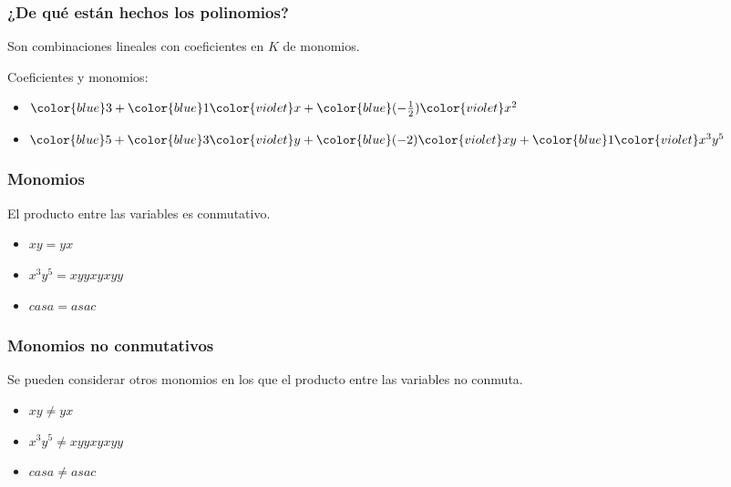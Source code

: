 \documentclass[spanish, aspectratio=169, hidecontrols]{beamer}
\begin{document}
\begin{frame}
  \frametitle{¿De qué están hechos los polinomios?}
  \pause
  Son combinaciones lineales con coeficientes en $K$ de monomios.
  \begin{exampleblock}{}
    {\color{blue}Coeficientes} y {\color{violet}monomios}:
    \begin{itemize}
      \item ${\color{blue}3} + {\color{blue}1} {\color{violet}x} + {\color{blue}(-\frac{1}{2})} {\color{violet}x^2}$
      \item ${\color{blue}5} + {\color{blue}3} {\color{violet}y} + {\color{blue}(-2)} {\color{violet}x y} + {\color{blue}1} {\color{violet}x^3 y^5}$
    \end{itemize}
  \end{exampleblock}
\end{frame}

\begin{frame}
  \frametitle{Monomios}
  \pause
  El producto entre las variables es conmutativo.
  \pause
  \begin{exampleblock}{}
    \begin{itemize}
      \item $xy = yx$
      \item $x^3 y^5 = xyyxyxyy$
      \item $casa = asac$
    \end{itemize}
  \end{exampleblock}

\end{frame}

\begin{frame}
  \frametitle{Monomios no conmutativos}
  \pause
  Se pueden considerar otros monomios en los que el producto entre las variables no conmuta.
  \begin{exampleblock}{}
    \begin{itemize}
      \item $xy ≠ yx$
      \item $x^3 y^5 ≠ xyyxyxyy$
      \item $casa ≠ asac$
    \end{itemize}
  \end{exampleblock}
\end{frame}
\end{document}
